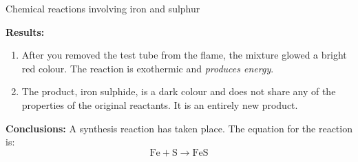 \begin{g_experiment}{Chemical reactions involving iron and sulphur }
	\par
      \label{m38709*id63554}\noindent{}\textbf{Results:}
          \newline
        \label{m38709*id63560}\begin{enumerate}[noitemsep, label=\textbf{\arabic*}. ] 
            \label{m38709*uid25}\item After you removed the test tube from the flame, the mixture glowed a bright red colour. The reaction is exothermic and \textsl{produces energy}.
\label{m38709*uid26}\item The product, iron sulphide, is a dark colour and does not share any of the properties of the original reactants. It is an entirely new product.
\end{enumerate}
        \par 
        \label{m38709*id63594}\noindent{}\textbf{Conclusions:}
          \newline
A synthesis reaction has taken place. The equation for the reaction is:
        \label{m38709*id63604}\nopagebreak\noindent{}
    \begin{equation}
    \mathrm{Fe}+\mathrm{S}\to \mathrm{FeS}\tag{12.6}
      \end{equation}
    \par 
\end{g_experiment}
\label{m38709*secfhsst!!!underscore!!!id294}
